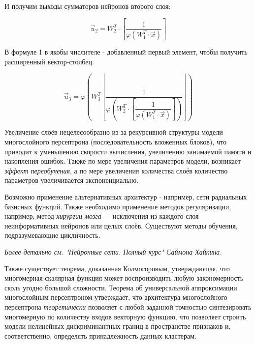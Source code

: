 \documentclass{article}
\numberwithin{equation}{subsection}
\begin{document}
И получим выходы сумматоров нейронов второго слоя:


\begin{equation}
    \vec{u}_2 = W_2^T \cdot [\dfrac{1}{\varphi(W_1^T \cdot \vec{x})}]
\end{equation}


В формуле 1 в якобы числителе - добавленный первый элемент, чтобы получить расширенный вектор-столбец.

\begin{equation}
    \vec{u}_3 = \varphi(W_3^T[\dfrac{1}{\varphi(W_2^T \cdot [\dfrac{1}{\varphi(W_1^T \cdot \vec{x})}])}])
\end{equation}



Увеличение слоёв нецелесообразно из-за рекурсивной структуры модели многослойного 
персептрона (последовательность вложенных блоков), что приводит к уменьшению 
скорости вычисления, увеличению занимаемой памяти и накопления ошибок.
Также по мере увеличения параметров модели, возникает \textit{эффект переобучения}, 
а по мере увеличения количества слоёв количество параметров увеличивается экспоненциально.

Возможно применение альтернативных архитектур - например, сети радиальных базисных функций.
Также необходимо применение методов регуляризации, например, метод \textit{хирургии мозга} ---
исключения из каждого слоя неинформативных нейронов или целых слоёв.
Существуют методы обучения, подразумевающие цикличность.

\begin{myquote}
    \textit{Более детально см. "Нейронные сети. Полный курс" Саймона Хайкина.}
\end{myquote}

Также существует теорема, доказанная Колмогоровым, утверждающая, что многомерная 
скалярная функция может воспроизводить любую закономерность сколь угодно большой 
сложности. Теорема об универсальной аппроксимации многослойным персептроном 
утверждает, что архитектура многослойного персептрона \textit{теоретически} 
позволяет с любой заданной точностью синтезировать многомерную по количеству 
входов векторную функцию, что позволяет строить модели нелинейных 
дискриминантных границ в пространстве признаков и, соответственно, определять 
принадлежность данных кластерам. 
\end{document}
